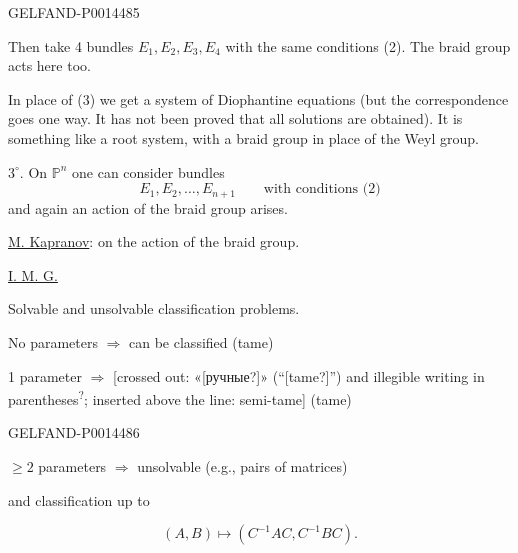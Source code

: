 \begin{GelfandAdjacentEvidence}{GELFAND-P001448}{5}


Then take 4 bundles \(E_1,E_2,E_3,E_4\) with the same conditions (2). The braid group acts here too.

In place of (3) we get a system of Diophantine equations
(but the correspondence goes one way. It has not been proved that all solutions are obtained).
It is something like a root system, with a braid group in place of the Weyl group.

\(3^{\circ}\). On \(\mathbb{P}^{n}\) one can consider bundles
\begin{equation*}
E_1,E_2,\ldots,E_{n+1}\qquad\text{with conditions (2)}
\end{equation*}
and again an action of the braid group arises.

\uline{M. Kapranov}: on the action of the braid group.

\uline{I. M. G.}

Solvable and unsolvable classification problems.

No parameters \(\Rightarrow\) can be classified (tame)

1 parameter \(\Rightarrow\)
[crossed out: «[ручные?]» (“[tame?]”) and illegible writing in parentheses\textsuperscript{?}; inserted above the line: semi-tame] (tame)
\end{GelfandAdjacentEvidence}
\begin{GelfandAdjacentEvidence}{GELFAND-P001448}{6}


\(\geq 2\) parameters \(\Rightarrow\) unsolvable (e.g., pairs of matrices)

and classification up to
\end{GelfandAdjacentEvidence}

\begin{equation*}
(A,B)\mapsto(C^{-1}AC,C^{-1}BC).
\end{equation*}


